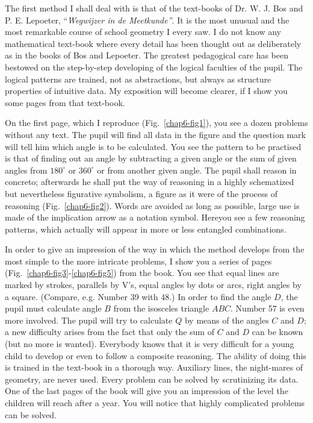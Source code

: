 The first method I shall deal with is that of the text-books of Dr. W. J. Bos and P. E. Lepoeter, ``{\em Wegwijzer in de Meetkunde''}. It is the most unusual and the most remarkable course of school geometry I every saw. I do not know any mathematical text-book where every detail has been thought out as deliberately as in the books of Bos and Lepoeter. The greatest pedagogical care has been bestowed on the step-by-step developing of the logical faculties of the pupil. The logical patterns are trained, not as abstractions, but always as structure properties of intuitive data. My exposition will become clearer, if I show you some pages from that text-book.

On the first page, which I reproduce (Fig.~\ref{chap6-fig1}), you see a dozen problems without any text. The pupil will find all data in the figure and the question mark will tell him which angle is to be calculated. You see the pattern to be practised is that of finding out an angle by subtracting a given angle or the sum of given angles from $180^{\circ}$ or $360^{\circ}$ or from another given angle. The pupil shall reason in concreto; afterwards he shall put the way of reasoning in a highly schematized but nevertheless figurative symbolism, a figure as it were of the process of reasoning (Fig.~\ref{chap6-fig2}). Words are avoided as long as possible, large use is made of the implication arrow as a notation symbol. Here\pageoriginale you see a few reasoning patterns, which actually will appear in more or less entangled combinations.

In order to give an impression of the way in which the method develops from the most simple to the more intricate problems, I show you a series of pages (Fig.~\ref{chap6-fig3}-\ref{chap6-fig5}) from the book. You see that equal lines are marked by strokes, parallels by V's, equal angles by dots or arcs, right angles by a square. (Compare, e.g. Number 39 with 48.) In order to find the angle $D$, the pupil must calculate angle $B$ from the isosceles triangle $ABC$. Number 57 is even more involved. The pupil will try to calculate $Q$ by means of the angles $C$ and $D$; a new difficulty arises from the fact that only the sum of $C$ and $D$ can be known (but no more is wanted). Everybody knows that it is very difficult for a young child to develop or even to follow a composite reasoning. The ability of doing this is trained in the text-book in a thorough way. Auxiliary lines, the night-mares of geometry, are never used. Every problem can be solved by scrutinizing its data. One of the last pages of the book will give you an impression of the level the children will reach after a year. You will notice that highly complicated problems can be solved.

